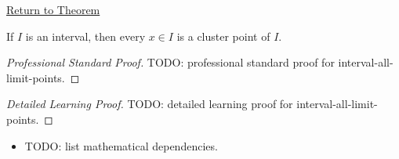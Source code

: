 \newpage
{}
\label{prf:interval-all-limit-points}

\begin{remark*}[Return]
\hyperref[cor:interval-all-limit-points]{Return to Theorem}
\end{remark*}

\begin{theorem*}
If $I$ is an interval, then every $x\in I$ is a cluster point of $I$.

\smallskip\noindent
\end{theorem*}

\begin{proof}[Professional Standard Proof]
\LRAProofBodyStart
TODO: professional standard proof for interval-all-limit-points.
\end{proof}

\begin{proof}[Detailed Learning Proof]
\LRAProofBodyStart
TODO: detailed learning proof for interval-all-limit-points.
\end{proof}

\begin{remark*}
\end{remark*}

\begin{dependencies}
\begin{itemize}
  \item TODO: list mathematical dependencies.
\end{itemize}
\end{dependencies}

\clearpage
